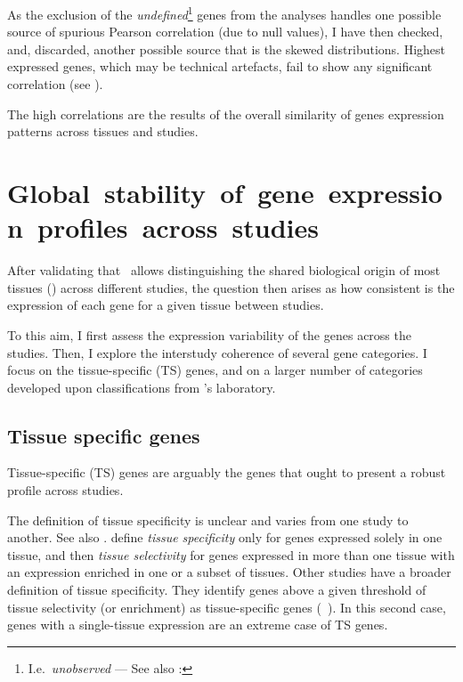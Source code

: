 As the exclusion of the \emph{undefined}\footnote{I.e.\
\emph{unobserved} --- See also
: }
genes from the analyses handles
one possible source of spurious Pearson correlation (due to null values),
I have then checked, and, discarded,
another possible source that is the skewed distributions.
Highest expressed genes, which may be technical artefacts,
fail to show any significant correlation (see ).\mybr\

The high correlations are the results of the overall similarity
of genes expression patterns across tissues and studies.\mybr\

\section{Global~stability~of~gene~expression~profiles~across~studies}

After validating that \Rnaseq\ allows distinguishing the shared biological origin
of most tissues (\treps) across different studies,
the question then arises as how consistent is
the expression of each gene for a given tissue between studies.\mybr\

To this aim,
I first assess the expression variability of the genes
across the studies.
Then, I explore the interstudy coherence of several gene categories.
I focus on the tissue-specific (TS) genes,
and on a larger number of categories developed upon
classifications from \uhlen{}'s laboratory.\mybr\


\subsection{Tissue specific genes}\label{sub:TisSpeGene}

Tissue-specific (TS) genes are arguably the genes
that ought to present a robust profile across studies.

The definition of tissue specificity is unclear and
varies from one study to another.
See also \citet{Santos2015-rj}.
\citet{Liang2006-mk} define \emph{tissue specificity}
only for genes expressed solely in one tissue,
and then \emph{tissue selectivity} for genes expressed in more than one tissue
with an expression enriched in one or a subset of tissues.
Other studies have a broader definition of tissue specificity.
They identify genes above a given threshold of tissue selectivity (or enrichment)
as tissue-specific genes
(\eg\ \citet{Uhlen2014,Jiang2016-sv}).
In this second case,
genes with a single-tissue expression are an extreme case of \gls{TS} genes.\mybr\

